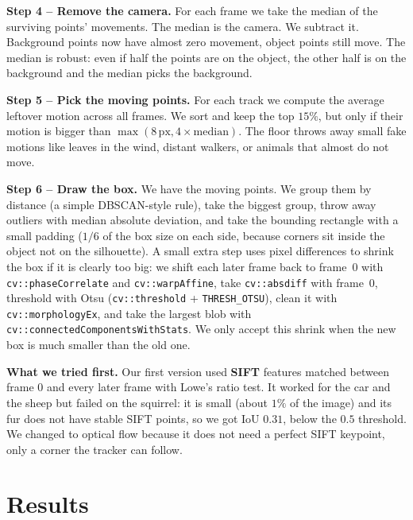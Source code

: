 \documentclass[10pt,a4paper]{article}
\begin{document}
\textbf{Step 4 -- Remove the camera.} For each frame we take the
median of the surviving points' movements. The median is the
camera. We subtract it. Background points now have almost zero
movement, object points still move. The median is robust: even
if half the points are on the object, the other half is on the
background and the median picks the background.

\textbf{Step 5 -- Pick the moving points.} For each track we
compute the average leftover motion across all frames. We sort
and keep the top $15\%$, but only if their motion is bigger than
$\max(8\,\text{px}, 4\times\text{median})$. The floor throws
away small fake motions like leaves in the wind, distant
walkers, or animals that almost do not move.

\textbf{Step 6 -- Draw the box.} We have the moving points. We
group them by distance (a simple DBSCAN-style rule), take the
biggest group, throw away outliers with median absolute deviation,
and take the bounding rectangle with a small padding ($1/6$ of the
box size on each side, because corners sit inside the object not on
the silhouette). A small extra step uses pixel differences to
shrink the box if it is clearly too big: we shift each later frame
back to frame~0 with \texttt{cv::phaseCorrelate} and
\texttt{cv::warpAffine}, take \texttt{cv::absdiff} with frame~0,
threshold with Otsu (\texttt{cv::threshold} +
\texttt{THRESH\_OTSU}), clean it with \texttt{cv::morphologyEx}, and
take the largest blob with
\texttt{cv::connectedComponentsWithStats}. We only accept this
shrink when the new box is much smaller than the old one.

\textbf{What we tried first.} Our first version used \textbf{SIFT}
features matched between frame 0 and every later frame with
Lowe's ratio test. It worked for the car and the sheep but failed
on the squirrel: it is small (about $1\%$ of the image) and its
fur does not have stable SIFT points, so we got IoU $0.31$, below
the $0.5$ threshold. We changed to optical flow because it does
not need a perfect SIFT keypoint, only a corner the tracker can
follow.

\section{Results}
\end{document}
